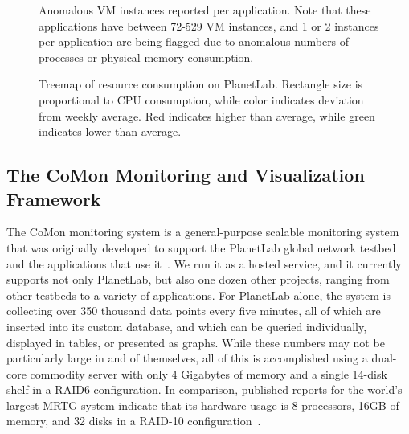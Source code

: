\begin{figure*}[t]
\begin{minipage}[t]{3.5in}
\caption{Anomalous VM instances reported per application. Note that
these applications have between 72-529 VM instances, and 1 or 2 instances
per application are being flagged due to anomalous numbers of processes
or physical memory consumption.}
\label{fig_comon_anomaly}
\end{minipage}
\hspace{.25in}
\begin{minipage}[t]{2.75in}
\caption{Treemap of resource consumption on PlanetLab. Rectangle size
is proportional to CPU consumption, while color indicates deviation
from weekly average. Red indicates higher than average, while green
indicates lower than average.}
\label{fig_comon_treemap}
\end{minipage}
\end{figure*}

\subsection{The CoMon Monitoring and Visualization Framework}
\label{sec:comon}


The CoMon monitoring system is a general-purpose scalable monitoring
system that was originally developed to support the PlanetLab global
network testbed and the applications that use it~\cite{CoMon}. We run
it as a hosted service, and it currently supports not only PlanetLab,
but also one dozen other projects, ranging from other testbeds to a
variety of applications. For PlanetLab alone, the system is collecting
over 350 thousand data points every five minutes, all of which are
inserted into its custom database, and which can be queried
individually, displayed in tables, or presented as graphs. While these
numbers may not be particularly large in and of themselves, all of this
is accomplished using a dual-core commodity server with only 4
Gigabytes of memory and a single 14-disk shelf in a RAID6
configuration. In comparison, published reports for the world's
largest MRTG system indicate that its hardware usage is 8 processors,
16GB of memory, and 32 disks in a RAID-10 configuration~\cite{Plonka}.


